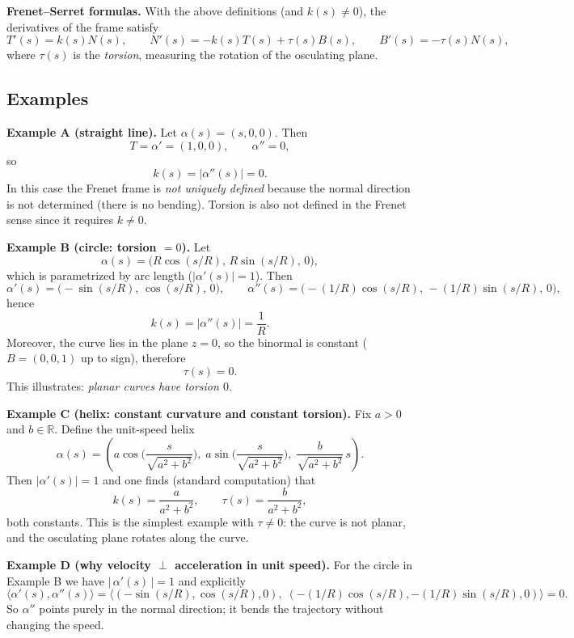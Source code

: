 \documentclass[12pt,a4paper]{article}
\theoremstyle{plain}
\theoremstyle{definition}      %
\begin{document}
\medskip
\noindent\textbf{Frenet--Serret formulas.}
With the above definitions (and $k(s)\neq 0$), the derivatives of the frame satisfy
\[
T'(s)=k(s)N(s),\qquad
N'(s)=-k(s)T(s)+\tau(s)B(s),\qquad
B'(s)=-\tau(s)N(s),
\]
where $\tau(s)$ is the \emph{torsion}, measuring the rotation of the osculating plane.

\subsection*{Examples}

\noindent\textbf{Example A (straight line).}
Let $\alpha(s)=(s,0,0)$. Then
\[
T=\alpha'=(1,0,0),\qquad \alpha''=0,
\]
so
\[
k(s)=|\alpha''(s)|=0.
\]
In this case the Frenet frame is \emph{not uniquely defined} because the normal direction is not determined
(there is no bending). Torsion is also not defined in the Frenet sense since it requires $k\neq 0$.

\medskip
\noindent\textbf{Example B (circle: torsion $=0$).}
Let
\[
\alpha(s)=\big(R\cos(s/R),\,R\sin(s/R),\,0\big),
\]
which is parametrized by arc length ($|\alpha'(s)|=1$). Then
\[
\alpha'(s)=\big(-\sin(s/R),\,\cos(s/R),\,0\big),\qquad
\alpha''(s)=\big(-(1/R)\cos(s/R),\, -(1/R)\sin(s/R),\,0\big),
\]
hence
\[
k(s)=|\alpha''(s)|=\frac{1}{R}.
\]
Moreover, the curve lies in the plane $z=0$, so the binormal is constant ($B=(0,0,1)$ up to sign),
therefore
\[
\tau(s)=0.
\]
This illustrates: \emph{planar curves have torsion $0$}.

\medskip
\noindent\textbf{Example C (helix: constant curvature and constant torsion).}
Fix $a>0$ and $b\in\mathbb{R}$. Define the unit-speed helix
\[
\alpha(s)=\left(a\cos\Big(\frac{s}{\sqrt{a^2+b^2}}\Big),\;
a\sin\Big(\frac{s}{\sqrt{a^2+b^2}}\Big),\;
\frac{b}{\sqrt{a^2+b^2}}\,s\right).
\]
Then $|\alpha'(s)|=1$ and one finds (standard computation) that
\[
k(s)=\frac{a}{a^2+b^2},\qquad
\tau(s)=\frac{b}{a^2+b^2},
\]
both constants. This is the simplest example with $\tau\neq 0$:
the curve is not planar, and the osculating plane rotates along the curve.

\medskip
\noindent\textbf{Example D (why velocity $\perp$ acceleration in unit speed).}
For the circle in Example B we have $|\,\alpha'(s)\,|=1$ and explicitly
\[
\big\langle \alpha'(s),\alpha''(s)\big\rangle
=
\big\langle (-\sin(s/R),\cos(s/R),0),\; (-(1/R)\cos(s/R),-(1/R)\sin(s/R),0)\big\rangle
=0.
\]
So $\alpha''$ points purely in the normal direction; it bends the trajectory without changing the speed.
\end{document}
